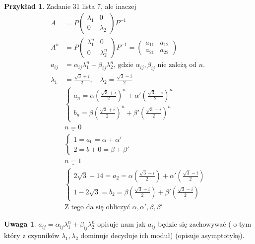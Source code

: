 \documentclass[10pt]{article}
\theoremstyle{definition}
\theoremstyle{definition}
\theoremstyle{definition}
\theoremstyle{definition}
\theoremstyle{remark}
\theoremstyle{definition}
\newtheorem*{uw}{Uwaga}
\theoremstyle{definition}
\theoremstyle{definition}
\theoremstyle{definition}
\newtheorem*{prz}{Przykład}
\theoremstyle{definition}
\begin{document}
\begin{prz} Zadanie 31 lista 7, ale inaczej
    \begin{align*}
        A &= P \begin{pmatrix} \lambda_1 & 0 \\ 0 & \lambda_2 \end{pmatrix} P^{-1} \\
        A^n &= P \begin{pmatrix} \lambda_1^n & 0 \\ 0 & \lambda_2^n \end{pmatrix} P^{-1} = 
        \begin{pmatrix} a_{11} & a_{12} \\ a_{21} & a_{22} \end{pmatrix} \\ 
        a_{ij} &= \alpha_{ij} \lambda_1^n + \beta_{ij} \lambda_2^n \text{, gdzie } \alpha_{ij},\beta_{ij} 
        \text{ nie zależą od } n. \\
        \lambda_1 &= \frac{\sqrt{3}+i}{2}, \quad \lambda_2 = \frac{\sqrt{3}-i}{2} \\ 
        &\begin{cases}
            a_n = \alpha (\frac{\sqrt{3}+i}{2})^n + \alpha' (\frac{\sqrt{3}-i}{2})^n \\ 
            b_n = \beta (\frac{\sqrt{3}+i}{2})^n + \beta' (\frac{\sqrt{3}-i}{2})^n 
        \end{cases} \\
        &\underline{n=0} \\ 
        &\begin{cases}
            1 = a_0 = \alpha + \alpha' \\ 
            2 = b+0 = \beta + \beta' 
        \end{cases} \\ 
        &\underline{n=1} \\ 
        &\begin{cases}
            2\sqrt{3} - 14 = a_2 = \alpha (\frac{\sqrt{3}+i}{2}) + \alpha' (\frac{\sqrt{3}-i}{2}) \\ 
            1 - 2\sqrt{3} = b_2 = \beta (\frac{\sqrt{3}+i}{2}) + \beta' (\frac{\sqrt{3}-i}{2})
        \end{cases} \\ 
        &\text{Z tego da się obliczyć } \alpha,\alpha',\beta,\beta'
    \end{align*}
\end{prz} 
\begin{uw} $a_{ij} = \alpha_{ij} \lambda_1 ^n + \beta_{ij} \lambda^n_2$ opisuje nam jak $a_{ij}$ będzie się 
    zachowywać ( o tym który z czynników $\lambda_1,\lambda_2$ dominuje decyduje ich moduł) 
    (opisuje asymptotykę). \end{uw}
\end{document}
